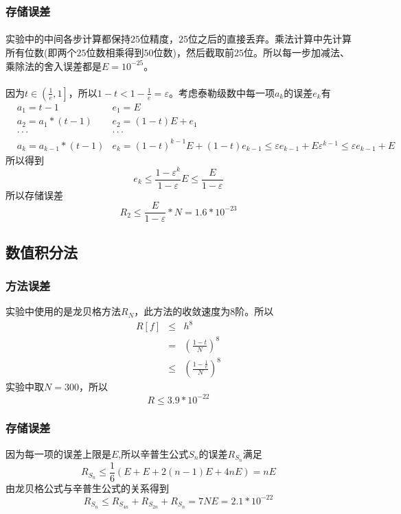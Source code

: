\documentclass[UTF8,twocolum,titlepage]{ctexart}
\begin{document}
\subsubsection*{存储误差}
\paragraph{}
实验中的中间各步计算都保持$25$位精度，$25$位之后的直接丢弃。乘法计算中先计算所有位数(即两个$25$位数相乘得到$50$位数)，然后截取前$25$位。所以每一步加减法、乘除法的舍入误差都是$E=10^{-25}$。
\paragraph{}
因为$t\in\left(\frac{1}{e},1\right]$，所以$1-t < 1-\frac{1}{e}=\varepsilon$。考虑泰勒级数中每一项$a_k$的误差$e_k$有
\begin{eqnarray*}
&a_1=t-1 &e_1=E\\
&a_2=a_1*(t-1) &e_2=(1-t)E+e_1\\
&\cdot\cdot\cdot&\cdot\cdot\cdot\\
&a_k=a_{k-1}*(t-1) &e_k=(1-t)^{k-1}E+(1-t)e_{k-1} \le \varepsilon e_{k-1}+E\varepsilon^{k-1} \le \varepsilon e_{k-1}+E
\end{eqnarray*}
所以得到$$e_k \le \frac{1-\varepsilon^k}{1-\varepsilon}E \le \frac{E}{1-\varepsilon}$$所以存储误差$$R_2 \le \frac{E}{1-\varepsilon}*N=1.6*10^{-23}$$
\subsection*{数值积分法}
\subsubsection*{方法误差}
实验中使用的是龙贝格方法$R_N$，此方法的收敛速度为8阶。所以
\begin{eqnarray*}
R\left[f\right] &\le& h^8\\&=&\left(\frac{1-t}{N}\right)^8\\ &\le& \left(\frac{1-\frac{1}{e}}{N}\right)^8
\end{eqnarray*}
实验中取$N=300$，所以$$R \le 3.9*10^{-22}$$
\subsubsection*{存储误差}
因为每一项的误差上限是$E$,所以辛普生公式$S_n$的误差$R_{S_n}$满足$$R_{S_n} \le \frac{1}{6}\left(E+E+2(n-1)E+4nE\right) = nE$$由龙贝格公式与辛普生公式的关系得到$$R_{S_n} \le R_{S_{4n}}+R_{S_{2n}}+R_{S_{n}}=7NE=2.1*10^{-22}$$
\end{document}
